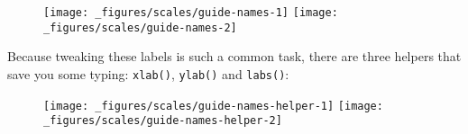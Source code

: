 \begin{Shaded}
\begin{Highlighting}[]
\StringTok{ }\NormalTok{(} \OperatorTok{:}\NormalTok{, } \NormalTok{, } \NormalTok{)}
\StringTok{ }\OperatorTok{+}\StringTok{ }\NormalTok{()}
\OperatorTok{+}\StringTok{ }\NormalTok{(}\NormalTok{)}
\OperatorTok{+}\StringTok{ }\NormalTok{(}\OperatorTok{+}\StringTok{ }\OperatorTok{^}\StringTok{ }
\end{Highlighting}
\end{Shaded}

\begin{figure}[H]
  \texttt{[image: \_figures/scales/guide-names-1]}%
  \texttt{[image: \_figures/scales/guide-names-2]}
\end{figure}

Because tweaking these labels is such a common task, there are three
helpers that save you some typing: \texttt{xlab()}, \texttt{ylab()} and
\texttt{labs()}:

\begin{Shaded}
\begin{Highlighting}[]
\StringTok{ }\OperatorTok{+}\StringTok{ }\NormalTok{(}\NormalTok{(}
\OperatorTok{+}\StringTok{ }
\StringTok{  }\NormalTok{(}\NormalTok{) }\OperatorTok{+}\StringTok{ }
\StringTok{  }\NormalTok{(}\NormalTok{)}
\OperatorTok{+}\StringTok{ }\NormalTok{(} \NormalTok{, } \NormalTok{, } \NormalTok{)}
\end{Highlighting}
\end{Shaded}

\begin{figure}[H]
  \texttt{[image: \_figures/scales/guide-names-helper-1]}%
  \texttt{[image: \_figures/scales/guide-names-helper-2]}
\end{figure}

